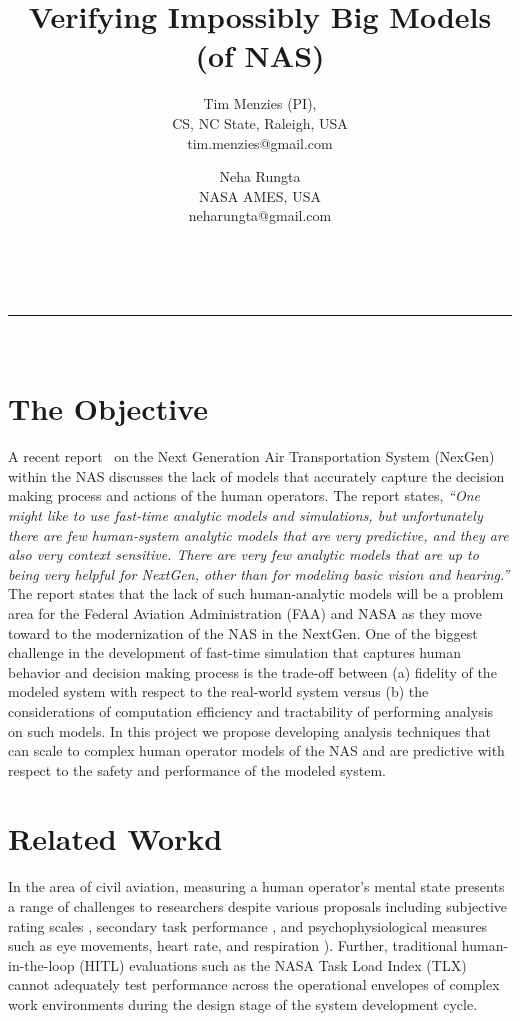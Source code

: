 \documentclass[12pt]{article}
\begin{document}
 
\vspace{-1cm}
\title{ Verifying Impossibly Big Models (of NAS)} 
\author{Tim Menzies (PI),\\
CS, NC State, Raleigh, USA\\
tim.menzies@gmail.com
\and
Neha Rungta\\
NASA AMES, USA\\
neharungta@gmail.com}
\date{}
\maketitle
\vspace{-0.75cm}
~\hrule~\newline

\section{The Objective}


A recent report~\cite{nrc:nextgen} on the Next Generation Air Transportation System (NexGen) within the NAS discusses the lack of models that accurately capture the decision making process and actions of the human operators. The report states, \emph{``One might like to use fast-time analytic models and simulations, but unfortunately there are few human-system analytic models that are very predictive, and they are also very context sensitive. There are very
few analytic models that are up to being very helpful for NextGen, other than for modeling basic vision and hearing.''} The report states that the lack of such human-analytic models will be a problem area for the Federal Aviation Administration (FAA) and NASA as they move toward to the modernization of the NAS in the NextGen. One of the biggest challenge in the development of fast-time simulation that captures human behavior and decision making process is the trade-off between (a) fidelity of the modeled system with respect to the real-world system versus (b) the considerations of computation efficiency and tractability of performing analysis on such models. In this project we propose developing analysis techniques that can scale to complex human operator models of the NAS and are predictive with respect to the safety and performance of the modeled system. 


\section{Related Workd}

In the area of civil aviation, measuring a human operator's mental
state presents a range of challenges to researchers despite various
proposals including subjective rating scales \cite{NASATLX88},
secondary task performance \cite{DualTaskMethodology91}, and
psychophysiological measures such as eye movements, heart rate, and
respiration \cite{MetricsWorkloadKramer91}).  Further, traditional
hu\-man\--in\--the\--lo\-op (HI\-TL) evaluations such as the NASA Task
Load Index (TLX) cannot adequately test performance across the
operational envelopes of complex work environments during the design
stage of the system development cycle.
\end{document}
